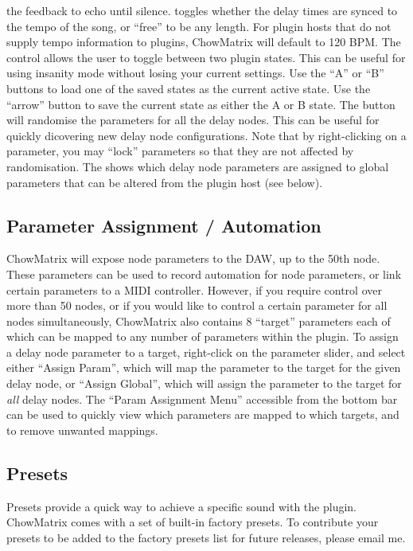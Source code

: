 \documentclass[landscape,twocolumn,a5paper]{manual}
\begin{document}
the feedback to echo until silence.
\newpar
{} toggles whether the delay times are
synced to the tempo of the song, or ``free'' to be any length.
For plugin hosts that do not supply tempo information to plugins,
ChowMatrix will default to 120 BPM.
\newpar
The  control allows the user to toggle
between two plugin states. This can be useful for using
insanity mode without losing your current settings. Use
the ``A'' or ``B'' buttons to load one of the saved states
as the current active state. Use the ``arrow'' button to
save the current state as either the A or B state.
\newpar
The  button will randomise the parameters
for all the delay nodes. This can be useful for quickly
dicovering new delay node configurations. Note that by right-clicking
on a parameter, you may ``lock'' parameters so that they are not
affected by randomisation.
\newpar
The  shows which delay
node parameters are assigned to global parameters that
can be altered from the plugin host (see below).

\subsection{Parameter Assignment / Automation}
ChowMatrix will expose node parameters to the DAW, up to
the 50th node. These parameters can be used to record
automation for node parameters, or link certain parameters
to a MIDI controller.
\newpar
However, if you require control over more than 50 nodes,
or if you would like to control a certain parameter for
all nodes simultaneously, ChowMatrix also contains 8
``target'' parameters each of which can be mapped to any
number of parameters within the plugin.
\newpar
To assign a delay node parameter to a target, right-click
on the parameter slider, and select either ``Assign Param'',
which will map the parameter to the target for the given delay
node, or ``Assign Global'', which will assign the parameter to
the target for \emph{all} delay nodes.
The ``Param Assignment Menu'' accessible from the bottom bar
can be used to quickly view which parameters are mapped to
which targets, and to remove unwanted mappings.
\newline
\newline
\newline
\subsection{Presets}
Presets provide a quick way to achieve a specific sound
with the plugin. ChowMatrix comes with a set of built-in
factory presets. To contribute your presets to be added
to the factory presets list for future releases, please
email me.
\end{document}
